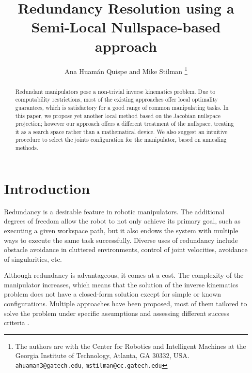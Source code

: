 \documentclass[conference]{IEEEtran}
\begin{document}
\title{Redundancy Resolution using a Semi-Local Nullspace-based approach}
\author{Ana Huam\'an Quispe and Mike Stilman%
  \thanks{The authors are with the Center for Robotics and Intelligent
    Machines at the Georgia Institute of Technology, Atlanta, GA
    30332, USA. {\tt\small ahuaman3@gatech.edu}, {\tt\small mstilman@cc.gatech.edu}}}
\maketitle

\begin{abstract}
Redundant manipulators pose a non-trivial inverse kinematics problem.
Due to computability restrictions, most of the existing approaches offer
local optimality guarantees, which is satisfactory for a good range of common 
manipulating tasks. In this paper, we propose yet another local method based
on the Jacobian nullspace projection; however our approach offers a 
different treatment of the nullspace, treating it as a search space rather
than a mathematical device. We also suggest an intuitive procedure to select
the joints configuration for the manipulator, based on annealing methods.
\end{abstract}

\section{Introduction}
Redundancy is a desirable feature in robotic manipulators. The 
additional degrees of freedom allow the robot to not only achieve
its primary goal, such as executing a given workspace path, but 
it also endows the system with multiple ways to execute the same 
task successfully. Diverse uses of redundancy include obstacle 
avoidance in cluttered environments, control of joint velocities,
avoidance of singularities, etc.

Although redundancy is advantageous, it comes at a
 cost. The complexity of the manipulator increases, which means
that the solution of the inverse kinematics problem does not have
a closed-form solution except for simple or known configurations.
Multiple approaches have been proposed, most of them tailored to
solve the problem under specific assumptions and assessing different
success criteria \cite{hooper-ns-1995}. 
\end{document}
